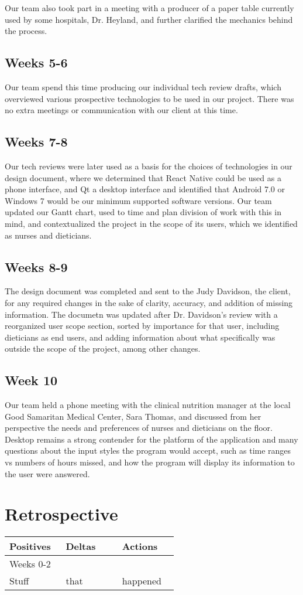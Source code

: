 \documentclass[onecolumn, draftclsnofoot,10pt, compsoc]{IEEEtran}
\begin{document}
Our team also took part in a meeting with a producer of a paper table currently used by some hospitals, Dr. Heyland, and further clarified the mechanics behind the process.
\subsection{Weeks 5-6}
Our team spend this time producing our individual tech review drafts, which overviewed various prospective technologies to be used in our project.
There was no extra meetings or communication with our client at this time.

\subsection{Weeks 7-8}
Our tech reviews were later used as a basis for the choices of technologies in our design document, where we determined that React Native could be used as a phone interface, and Qt a desktop interface and identified that Android 7.0 or Windows 7 would be our minimum supported software versions.
Our team updated our Gantt chart, used to time and plan division of work with this in mind, and contextualized the project in the scope of its users, which we identified as nurses and dieticians.

\subsection{Weeks 8-9}
The design document was completed and sent to the Judy Davidson, the client, for any required changes in the sake of clarity, accuracy, and addition of missing information.
The documetn was updated after Dr. Davidson's review with a reorganized user scope section, sorted by importance for that user, including dieticians as end users, and adding information about what specifically was outside the scope of the project, among other changes.

\subsection{Week 10}
Our team held a phone meeting with the clinical nutrition manager at the local Good Samaritan Medical Center, Sara Thomas, and discussed from her perspective the needs and preferences of nurses and dieticians on the floor.
Desktop remains a strong contender for the platform of the application and many questions about the input styles the program would accept, such as time ranges vs numbers of hours missed, and how the program will display its information to the user were answered.

\section{Retrospective}
\begin{tabular}{p{0.3\linewidth} p{0.3\linewidth} p{0.3\linewidth}}
\large{Positives} & \large{Deltas} & \large{Actions}\\
\hline
Weeks 0-2 & \nobreakspace & \nobreakspace\\
\hline
Stuff & that & happened\\
\hline


\end{tabular}
\end{document}
